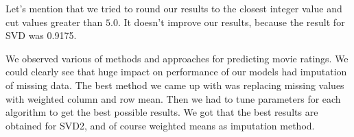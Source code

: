 \documentclass[10pt]{amsart}
\begin{document}
Let's mention that we tried to round our results to the closest integer value and cut values greater than $5.0$.
It doesn't improve our results, because the result for SVD was 0.9175.

We observed various of methods and approaches for predicting movie ratings.
We could clearly see that huge impact on performance of our models had imputation of missing data.
    The best method we came up with was replacing missing values with weighted column and row mean.
    Then we had to tune parameters for each algorithm to get the best possible results.
We got that the best results are obtained for SVD2, and of course weighted means as imputation method.
\end{document}
